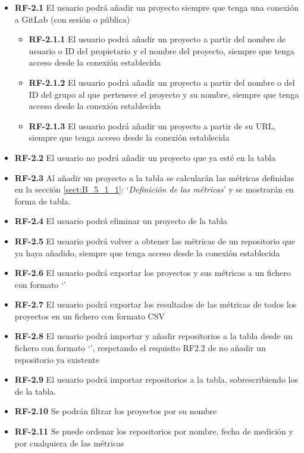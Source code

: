 \begin{itemize}
	\begin{itemize}
		\item \textbf{RF-2.1} El usuario podrá añadir un proyecto siempre que tenga una conexión a GitLab (con sesión o pública)
		\begin{itemize}
			\item \textbf{RF-2.1.1} El usuario podrá añadir un proyecto a partir del nombre de usuario o ID del propietario y el nombre del proyecto, siempre que tenga acceso desde la conexión establecida
			\item \textbf{RF-2.1.2} El usuario podrá añadir un proyecto a partir del nombre o del ID del grupo al que pertenece el proyecto y su nombre, siempre que tenga acceso desde la conexión establecida
			\item \textbf{RF-2.1.3} El usuario podrá añadir un proyecto a partir de su URL, siempre que tenga acceso desde la conexión establecida
		\end{itemize}
		\item \textbf{RF-2.2} El usuario no podrá añadir un proyecto que ya esté en la tabla
		\item \textbf{RF-2.3} Al añadir un proyecto a la tabla se calcularán las métricas definidas en la sección \ref{sect:B_5_1_1}: `\textit{Definición de las métricas}' y se mostrarán en forma de tabla.
		\item \textbf{RF-2.4} El usuario podrá eliminar un proyecto de la tabla
		\item \textbf{RF-2.5} El usuario podrá volver a obtener las métricas de un repositorio que ya haya añadido, siempre que tenga acceso desde la conexión establecida
		\item \textbf{RF-2.6} El usuario podrá exportar los proyectos y sus métricas a un fichero con formato `'
		\item \textbf{RF-2.7} El usuario podrá exportar los resultados de las métricas de todos los proyectos en un fichero con formato CSV
		\item \textbf{RF-2.8} El usuario podrá importar y añadir repositorios a la tabla  desde un fichero con formato `', respetando el requisito RF2.2 de no añadir un repositorio ya existente
		\item \textbf{RF-2.9} El usuario podrá importar repositorios a la tabla, sobrescribiendo los de la tabla.
		\item \textbf{RF-2.10} Se podrán filtrar los proyectos por su nombre
		\item \textbf{RF-2.11} Se puede ordenar los repositorios por nombre, fecha de medición y por cualquiera de las métricas

\end{itemize}
\end{itemize}

